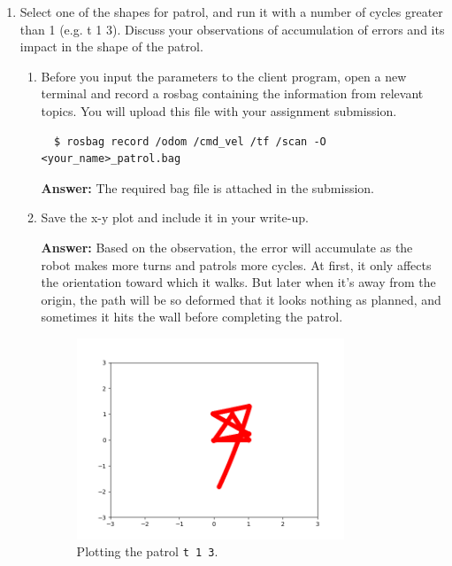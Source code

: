 \documentclass[12pt]{article}
\begin{document}
\begin{enumerate}
\begin{enumerate}
    \end{enumerate}

    \item Select one of the shapes for patrol, and run it with a number of cycles greater than 1 (e.g. t 1 3). Discuss your observations of accumulation of errors and its impact in the shape of the patrol.
    
    \begin{enumerate}

        \item Before you input the parameters to the client program, open a new terminal and record a rosbag containing the information from relevant topics. You will upload this file with your assignment submission.
        
\begin{verbatim}
  $ rosbag record /odom /cmd_vel /tf /scan -O <your_name>_patrol.bag
\end{verbatim}

        \textbf{Answer: }The required bag file is attached in the submission.
    
        \item Save the x-y plot and include it in your write-up.
        
        \textbf{Answer: }Based on the observation, the error will accumulate as the robot makes more turns and patrols more cycles. At first, it only affects the orientation toward which it walks. But later when it's away from the origin, the path will be so deformed that it looks nothing as planned, and sometimes it hits the wall before completing the patrol.

        \begin{figure}[H]
          \centering\includegraphics[width=8cm]{lab1figure/patrol_plot_3.png}\vspace{-10pt}
          \caption{Plotting the patrol \texttt{t 1 3}.}\label{fig:t_1_3}
          \end{figure}
        
    \end{enumerate}

\end{enumerate}
\end{document}
